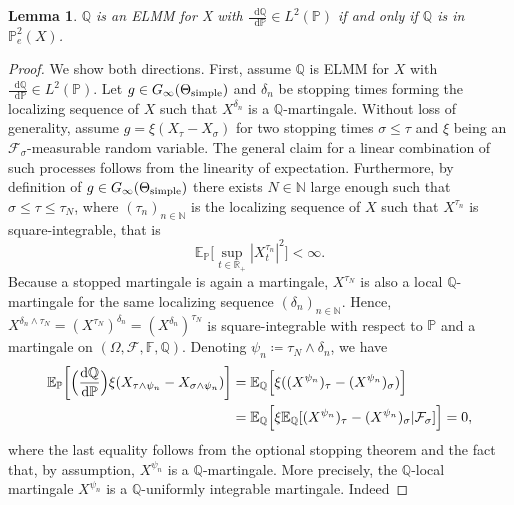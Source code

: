 \documentclass[11pt,a4paper,twoside,openany]{report}
\numberwithin{equation}{section}
\newcommand{\diff}{\mathop{}\!\mathrm{d}}
\theoremstyle{plain} %
\newtheorem{lemma}[theorem]{Lemma}
\theoremstyle{definition} %
\theoremstyle{remark} %
\begin{document}
\begin{lemma}\label{lemma:ELMM and P_e^2(X)}
    \(\mathbb{Q}\) is an ELMM for X with \(\frac{\diff \mathbb{Q}}{\diff \mathbb{P}}\in L^2(\mathbb{P})\) if and only if \(\mathbb{Q}\) is in \(\mathbb{P}_e^2(X)\).
\end{lemma}
\begin{proof}
    We show both directions. First, assume \(\mathbb{Q}\) is ELMM for \(X\) with \(\frac{\diff \mathbb{Q}}{\diff \mathbb{P}}\in L^2(\mathbb{P})\). 
    Let \(g\in G_{\infty}(\Theta_{\rm{simple}})\) and \(\delta_n\) be stopping times forming the localizing sequence of \(X\) such that \(X^{\delta_n}\) is a \(\mathbb{Q}\)-martingale. Without loss of generality, assume \(g=\xi(X_{\tau}-X_{\sigma})\) for two stopping times \(\sigma\leq\tau\) and \(\xi\) being an \(\mathcal{F}_{\sigma}\)-measurable random variable. The general claim for a linear combination of such processes follows from the linearity of expectation. 
    Furthermore, by definition of \(g\in G_{\infty}(\Theta_{\rm{simple}})\) there exists \(N\in\mathbb{N}\) large enough such that \(\sigma\leq\tau\leq \tau_N\), where \((\tau_n)_{n\in\mathbb{N}}\) is the localizing sequence of \(X\) such that \(X^{\tau_n}\) is square-integrable, that is 
    \begin{equation*}
        \mathbb{E}_{\mathbb{P}}\Big[\sup_{t\in\mathbb{R}_+}|X_t^{\tau_n}|^2\Big]<\infty.
    \end{equation*}
    Because a stopped martingale is again a martingale, \(X^{\tau_N}\) is also a local \(\mathbb{Q}\)-martingale for the same localizing sequence \((\delta_n)_{n\in\mathbb{N}}\). Hence, 
    \(X^{\delta_n\wedge \tau_N}=(X^{\tau_N})^{\delta_n}=(X^{\delta_n})^{\tau_N}\) is square-integrable with respect to \(\mathbb{P}\) and a martingale on \((\Omega,\mathcal{F},\mathbb{F},\mathbb{Q})\).
 Denoting \(\psi_n\coloneqq \tau_N\wedge \delta_n\), we have
    \begin{align}\label{eq:common localizing sequence}
        \mathbb{E}_\mathbb{P}\bigg[\Big(\frac{\diff\mathbb{Q}}{\diff\mathbb{P}}\Big)\xi(X_{\tau\wedge\psi_n}-X_{\sigma\wedge\psi_n})\bigg]&
        =\mathbb{E}_\mathbb{Q}\Big[\xi((X^{\psi_n})_{\tau}-(X^{\psi_n})_{\sigma})\Big]\notag\\&
        =\mathbb{E}_\mathbb{Q}\Big[\xi\mathbb{E}_\mathbb{Q}[(X^{\psi_n})_{\tau}-(X^{\psi_n})_{\sigma}|\mathcal{F}_{\sigma}]\Big]=0,
    \end{align}
    where the last equality follows from the optional stopping theorem and the fact that, by assumption, \(X^{\psi_n}\) is a \(\mathbb{Q}\)-martingale. More precisely, the \(\mathbb{Q}\)-local martingale \(X^{\psi_n}\) is a \(\mathbb{Q}\)-uniformly integrable martingale. Indeed 

\end{proof}
\end{document}
